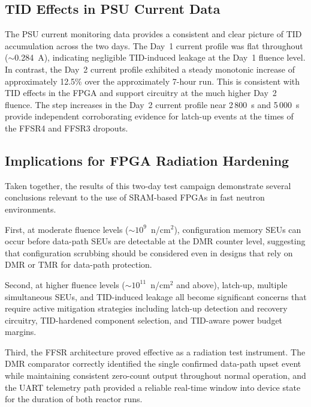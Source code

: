 \subsection{TID Effects in PSU Current Data}
\label{subsec:ch6_disc_tid}

The PSU current monitoring data provides a consistent and clear picture
of TID accumulation across the two days.  The Day~1 current profile was
flat throughout ($\sim$0.284~A), indicating negligible TID-induced
leakage at the Day~1 fluence level.  In contrast, the Day~2 current
profile exhibited a steady monotonic increase of approximately 12.5\%
over the approximately 7-hour run.  This is consistent with TID effects
in the FPGA and support circuitry at the much higher Day~2 fluence.
The step increases in the Day~2 current profile near 2\,800~s and
5\,000~s provide independent corroborating evidence for latch-up events
at the times of the FFSR4 and FFSR3 dropouts.

\subsection{Implications for FPGA Radiation Hardening}
\label{subsec:ch6_disc_hardening}

Taken together, the results of this two-day test campaign demonstrate
several conclusions relevant to the use of SRAM-based FPGAs in fast
neutron environments.

First, at moderate fluence levels ($\sim$$10^9$~n/cm$^2$), configuration
memory SEUs can occur before data-path SEUs are detectable at the DMR
counter level, suggesting that configuration scrubbing should be
considered even in designs that rely on DMR or TMR for data-path
protection.

Second, at higher fluence levels ($\sim$$10^{11}$~n/cm$^2$ and above),
latch-up, multiple simultaneous SEUs, and TID-induced leakage all become
significant concerns that require active mitigation strategies including
latch-up detection and recovery circuitry, TID-hardened component
selection, and TID-aware power budget margins.

Third, the FFSR architecture proved effective as a radiation test
instrument.  The DMR comparator correctly identified the single confirmed
data-path upset event while maintaining consistent zero-count output
throughout normal operation, and the UART telemetry path provided a
reliable real-time window into device state for the duration of both
reactor runs.


